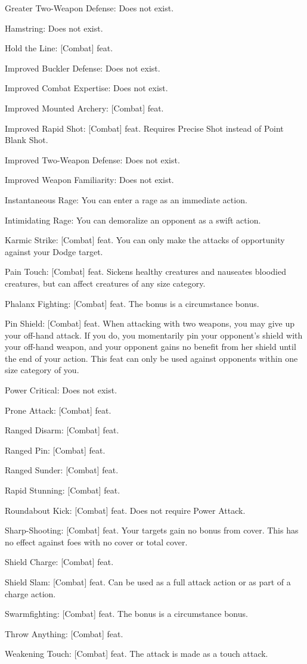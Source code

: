 \begin{itemize*}
\item Greater Two-Weapon Defense: Does not exist.
\item Hamstring: Does not exist.
\item Hold the Line: [Combat] feat.
\item Improved Buckler Defense: Does not exist.
\item Improved Combat Expertise: Does not exist.
\item Improved Mounted Archery: [Combat] feat.
\item Improved Rapid Shot: [Combat] feat. Requires Precise Shot instead of Point Blank Shot.
\item Improved Two-Weapon Defense: Does not exist.
\item Improved Weapon Familiarity: Does not exist.
\item Instantaneous Rage: You can enter a rage as an immediate action.
\item Intimidating Rage: You can demoralize an opponent as a swift action.
\item Karmic Strike: [Combat] feat. You can only make the attacks of opportunity against your Dodge target.
\item Pain Touch: [Combat] feat. Sickens healthy creatures and nauseates bloodied creatures, but can affect creatures of any size category.
\item Phalanx Fighting: [Combat] feat. The bonus is a circumstance bonus.
\item Pin Shield: [Combat] feat. When attacking with two weapons, you may give up your off-hand attack. If you do, you momentarily pin your opponent's shield with your off-hand weapon, and your opponent gains no benefit from her shield until the end of your action. This feat can only be used against opponents within one size category of you.
\item Power Critical: Does not exist.
\item Prone Attack: [Combat] feat.
\item Ranged Disarm: [Combat] feat.
\item Ranged Pin: [Combat] feat.
\item Ranged Sunder: [Combat] feat.
\item Rapid Stunning: [Combat] feat.
\item Roundabout Kick: [Combat] feat. Does not require Power Attack.
\item Sharp-Shooting: [Combat] feat. Your targets gain no bonus from cover. This has no effect against foes with no cover or total cover.
\item Shield Charge: [Combat] feat.
\item Shield Slam: [Combat] feat. Can be used as a full attack action or as part of a charge action.
\item Swarmfighting: [Combat] feat. The bonus is a circumstance bonus.
\item Throw Anything: [Combat] feat.
\item Weakening Touch: [Combat] feat. The attack is made as a touch attack.
\end{itemize*}
